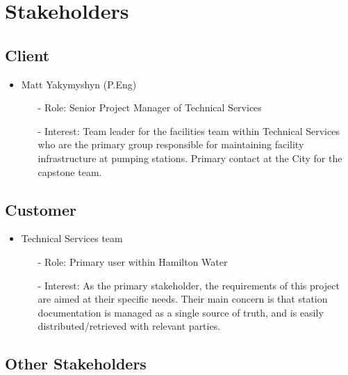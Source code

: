 \documentclass[12pt]{article}
\begin{document}
\section{Stakeholders}
\subsection{Client}

\begin{itemize}
\item Matt Yakymyshyn (P.Eng)
    \begin{itemize}
        \item[-] Role: Senior Project Manager of Technical Services
        \item[-] Interest: Team leader for the facilities team within
        Technical Services who are the primary group responsible for 
        maintaining facility infrastructure at pumping stations.
        Primary contact at the City for the capstone team.
    \end{itemize}
\end{itemize}

\subsection{Customer}

\begin{itemize}
    \item Technical Services team
    \begin{itemize}
        \item[-] Role: Primary user within Hamilton Water
        \item[-] Interest: As the primary stakeholder, the requirements 
        of this project are aimed at their specific needs. Their main concern
        is that station documentation is managed as a single source of truth,
        and is easily distributed/retrieved with relevant parties.
    \end{itemize} 
\end{itemize}
\subsection{Other Stakeholders}
\end{document}
